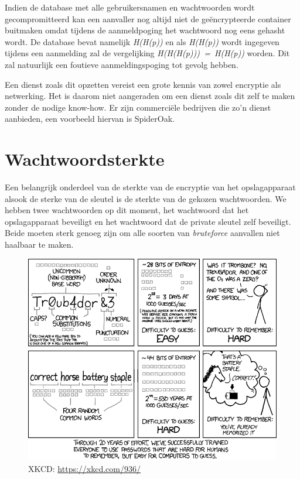 Indien de database met alle gebruikersnamen en wachtwoorden wordt
gecompromitteerd kan een aanvaller nog altijd niet de geëncrypteerde container
buitmaken omdat tijdens de aanmeldpoging het wachtwoord nog eens gehasht wordt.
De database bevat namelijk \textit{H(H(p))} en als \textit{H(H(p))} wordt
ingegeven tijdens een aanmelding zal de vergelijking 
\textit{H(H(H(p)))~=~H(H(p))} worden. Dit zal natuurlijk een foutieve 
aanmeldingspoging tot gevolg
hebben.

Een dienst zoals dit opzetten vereist een grote kennis van zowel encryptie als
netwerking. Het is daarom niet aangeraden om een dienst zoals dit zelf te maken
zonder de nodige know-how. Er zijn commerciële bedrijven die zo’n dienst
aanbieden, een voorbeeld hiervan is SpiderOak.

\section{Wachtwoordsterkte}
\label{sec:wachtwoordsterkte}

Een belangrijk onderdeel van de sterkte van de encryptie van het opslagapparaat
alsook de sterke van de sleutel is de sterkte van de gekozen wachtwoorden. We
hebben twee wachtwoorden op dit moment, het wachtwoord dat het opslagapparaat
beveiligt en het wachtwoord dat de private sleutel zelf beveiligt. Beide moeten
sterk genoeg zijn om alle soorten van \textit{bruteforce} aanvallen niet
haalbaar te maken.

\begin{figure}[H]
	\includegraphics[width=\textwidth,keepaspectratio]{img/password-strength-xkcd.png}
	\centering
	\caption{XKCD: \url{https://xkcd.com/936/}}
	\label{fig:wachtwoord-sterkte-xkcd}
\end{figure}

